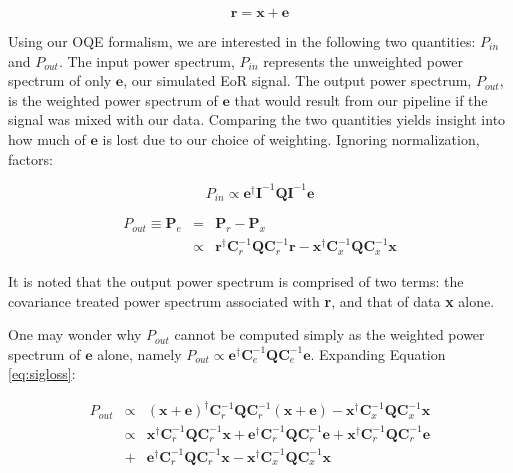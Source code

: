 \documentclass[preprint2,numberedappendix,tighten,twocolappendix]{aastex6}  %
\begin{document}
\begin{equation}
\textbf{r} = \textbf{x} + \textbf{e}
\end{equation}

Using our OQE formalism, we are interested in the following two quantities: $P_{in}$ and $P_{out}$. The input power spectrum, $P_{in}$ represents the unweighted power spectrum of only $\textbf{e}$, our simulated EoR signal. The output power spectrum, $P_{out}$, is the weighted power spectrum of $\textbf{e}$ that would result from our pipeline if the signal was mixed with our data. Comparing the two quantities yields insight into how much of $\textbf{e}$ is lost due to our choice of weighting. Ignoring normalization, factors:

\begin{equation}
P_{in} \propto \textbf{e}^{\dagger}\textbf{I}^{-1}\textbf{Q}\textbf{I}^{-1}\textbf{e}
\end{equation}

\begin{eqnarray}
\label{eq:sigloss}
P_{out} \equiv \textbf{P}_{e} &=& \textbf{P}_{r}-\textbf{P}_{x} \nonumber \\
&\propto& \textbf{r}^{\dagger}\textbf{C}_{r}^{-1}\textbf{Q}\textbf{C}_{r}^{-1}\textbf{r} - \textbf{x}^{\dagger}\textbf{C}_{x}^{-1}\textbf{Q}\textbf{C}_{x}^{-1}\textbf{x} 
\end{eqnarray}

It is noted that the output power spectrum is comprised of two terms: the covariance treated power spectrum associated with \textbf{r}, and that of data \textbf{x} alone. 

One may wonder why $P_{out}$ cannot be computed simply as the weighted power spectrum of $\textbf{e}$ alone, namely $P_{out} \propto \textbf{e}^{\dagger}\textbf{C}_{e}^{-1}\textbf{Q}\textbf{C}_{e}^{-1}\textbf{e}$. Expanding Equation \ref{eq:sigloss}:

\begin{eqnarray}
P_{out} &\propto& (\textbf{x}+\textbf{e})^{\dagger}\textbf{C}_{r}^{-1}\textbf{Q}\textbf{C}_{r}^{-1}(\textbf{x}+\textbf{e}) - \textbf{x}^{\dagger}\textbf{C}_{x}^{-1}\textbf{Q}\textbf{C}_{x}^{-1}\textbf{x} \nonumber \\
&\propto& \textbf{x}^{\dagger}\textbf{C}_{r}^{-1}\textbf{Q}\textbf{C}_{r}^{-1}\textbf{x} + \textbf{e}^{\dagger}\textbf{C}_{r}^{-1}\textbf{Q}\textbf{C}_{r}^{-1}\textbf{e} + \textbf{x}^{\dagger}\textbf{C}_{r}^{-1}\textbf{Q}\textbf{C}_{r}^{-1}\textbf{e} \nonumber \\
&+& \textbf{e}^{\dagger}\textbf{C}_{r}^{-1}\textbf{Q}\textbf{C}_{r}^{-1}\textbf{x} - \textbf{x}^{\dagger}\textbf{C}_{x}^{-1}\textbf{Q}\textbf{C}_{x}^{-1}\textbf{x} \nonumber 
\end{eqnarray}
\end{document}
